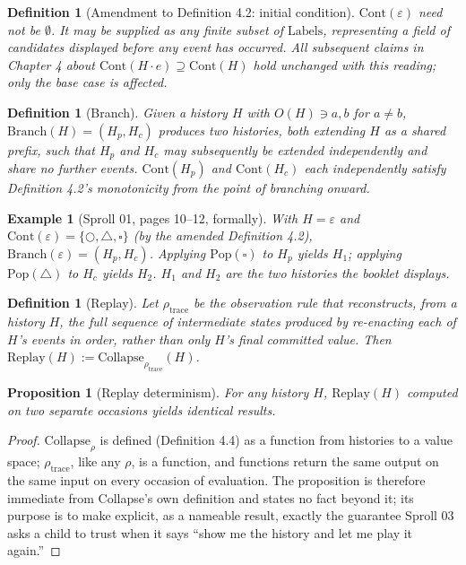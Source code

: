 \documentclass[11pt,twoside]{book}
\newtheorem{proposition}[theorem]{Proposition}
\newtheorem{definition}[theorem]{Definition}
\newtheorem{example}[theorem]{Example}
\begin{document}
\begin{definition}[Amendment to Definition 4.2: initial condition]
$\mathrm{Cont}(\varepsilon)$ need not be $\emptyset$. It may be supplied as any finite subset of $\mathrm{Labels}$, representing a field of candidates displayed before any event has occurred. All subsequent claims in Chapter 4 about $\mathrm{Cont}(H \cdot e) \supseteq \mathrm{Cont}(H)$ hold unchanged with this reading; only the base case is affected.
\end{definition}

\begin{definition}[Branch]
Given a history $H$ with $O(H) \ni a, b$ for $a \neq b$, $\mathrm{Branch}(H) = (H_p, H_c)$ produces two histories, both extending $H$ as a shared prefix, such that $H_p$ and $H_c$ may subsequently be extended independently and share no further events. $\mathrm{Cont}(H_p)$ and $\mathrm{Cont}(H_c)$ each independently satisfy Definition 4.2's monotonicity from the point of branching onward.
\end{definition}

\begin{example}[Sproll 01, pages 10--12, formally]
With $H = \varepsilon$ and $\mathrm{Cont}(\varepsilon) = \{\bigcirc, \triangle, \square\}$ (by the amended Definition 4.2), $\mathrm{Branch}(\varepsilon) = (H_p, H_c)$. Applying $\mathrm{Pop}(\square)$ to $H_p$ yields $H_1$; applying $\mathrm{Pop}(\triangle)$ to $H_c$ yields $H_2$. $H_1$ and $H_2$ are the two histories the booklet displays.
\end{example}

\begin{definition}[Replay]
Let $\rho_{\mathrm{trace}}$ be the observation rule that reconstructs, from a history $H$, the full sequence of intermediate states produced by re-enacting each of $H$'s events in order, rather than only $H$'s final committed value. Then $\mathrm{Replay}(H) := \mathrm{Collapse}_{\rho_{\mathrm{trace}}}(H)$.
\end{definition}

\begin{proposition}[Replay determinism]
For any history $H$, $\mathrm{Replay}(H)$ computed on two separate occasions yields identical results.
\end{proposition}

\begin{proof}
$\mathrm{Collapse}_\rho$ is defined (Definition 4.4) as a function from histories to a value space; $\rho_{\mathrm{trace}}$, like any $\rho$, is a function, and functions return the same output on the same input on every occasion of evaluation. The proposition is therefore immediate from Collapse's own definition and states no fact beyond it; its purpose is to make explicit, as a nameable result, exactly the guarantee Sproll 03 asks a child to trust when it says ``show me the history and let me play it again.''
\end{proof}
\end{document}
